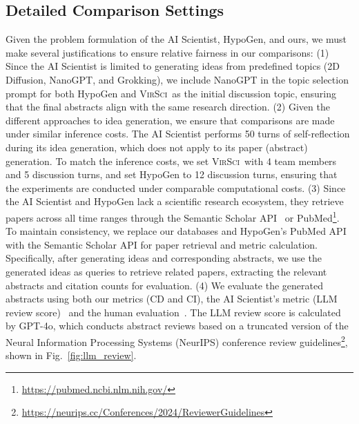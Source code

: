 \documentclass[11pt]{article}
\def\modelname{\textsc{VirSci\xspace}}
\begin{document}
\subsection{Detailed Comparison Settings}\label{sec:detail_comparison}
Given the problem formulation of the AI Scientist, HypoGen, and ours, we must make several justifications to ensure relative fairness in our comparisons:
(1) Since the AI Scientist is limited to generating ideas from predefined topics (2D Diffusion, NanoGPT, and Grokking), we include NanoGPT in the topic selection prompt for both HypoGen and \modelname\ as the initial discussion topic, ensuring that the final abstracts align with the same research direction.
(2) Given the different approaches to idea generation, we ensure that comparisons are made under similar inference costs. The AI Scientist performs 50 turns of self-reflection during its idea generation, which does not apply to its paper (abstract) generation.
To match the inference costs, we set \modelname\ with 4 team members and 5 discussion turns, and set HypoGen to 12 discussion turns, ensuring that the experiments are conducted under comparable computational costs.
(3) Since the AI Scientist and HypoGen lack a scientific research ecosystem, they retrieve papers across all time ranges through the Semantic Scholar API~\citep{fricke2018semantic} or PubMed\footnote{\url{https://pubmed.ncbi.nlm.nih.gov/}}. To maintain consistency, we replace our databases and HypoGen's PubMed API with the Semantic Scholar API for paper retrieval and metric calculation. 
Specifically, after generating ideas and corresponding abstracts, we use the generated ideas as queries to retrieve related papers, extracting the relevant abstracts and citation counts for evaluation.
(4) We evaluate the generated abstracts using both our metrics (CD and CI), the AI Scientist's metric (LLM review score)~\citep{lu2024ai} and the human evaluation~\citep{si2024can}. The LLM review score is calculated by GPT-4o, which conducts abstract reviews based on a truncated version of the Neural Information Processing Systems (NeurIPS) conference review guidelines\footnote{\url{https://neurips.cc/Conferences/2024/ReviewerGuidelines}}, shown in Fig.~\ref{fig:llm_review}. 
\end{document}
